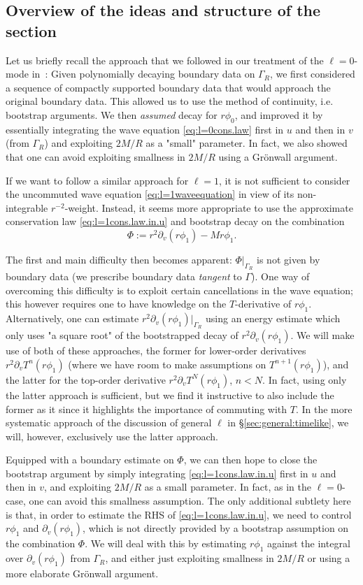 \documentclass[11pt,english]{article}
\numberwithin{equation}{section}
\theoremstyle{remark}
\theoremstyle{plain}
\theoremstyle{remark}
\newcommand{\pv}{\partial_v}
\renewcommand{\(}{\left(}
\renewcommand{\)}{\right)}
\newcommand{\pho}{(r\phi_1)}
\begin{document}
\subsection{Overview of the ideas and structure of the section}
Let us briefly recall the approach that we followed in our treatment of the $\ell=0$-mode in~\cite{I}:  
Given polynomially decaying boundary data on $\Gamma_R$, we first considered a sequence of compactly supported boundary data that would approach the original boundary data. 
This allowed us to use the method of continuity, i.e. bootstrap arguments. 
We then \textit{assumed} decay for $r\phi_0$, and improved it by essentially  integrating the wave equation \eqref{eq:l=0cons.law} first in $u$ and then in $v$ (from $\Gamma_R$) and exploiting $2M/R$ as a "small" parameter. 
In fact, we also showed that one can avoid exploiting smallness in $2M/R$ using a Gr\"onwall argument.


If we want to follow a similar approach for $\ell=1$, it is not sufficient to consider the uncommuted wave equation \eqref{eq:l=1waveequation} in view of its non-integrable $r^{-2}$-weight. 
Instead, it seems more appropriate to use the approximate conservation law \eqref{eq:l=1cons.law.in.u} and bootstrap decay on the combination 
$$\Phi:=r^2\pv(r\phi_1)-Mr\phi_1.$$ 

The first and main difficulty then becomes apparent: $\Phi|_{\Gamma_R}$ is not given by boundary data (we prescribe boundary data \textit{tangent} to $\Gamma$).
 One way of overcoming this difficulty  is to exploit certain cancellations in the wave equation; this however requires one to have knowledge on the $T$-derivative of $r\phi_1$.
  Alternatively, one can  estimate $r^2\pv\pho|_{\Gamma_R}$ using an energy estimate which only uses "a square root" of the bootstrapped decay of $r^2\pv\pho$. 
  We will make use of both of these approaches, the former for lower-order derivatives $r^2\pv T^n\pho$ (where we have room to make assumptions on $T^{n+1}\pho$), and the latter for the top-order derivative $r^2\pv T^N\pho$, $n<N$. 
  In fact,  using only the latter approach is sufficient, but we find it instructive to also include the former as it since it highlights the importance of commuting with $T$.   
   In the more systematic approach of the discussion of general $\ell$ in \S\ref{sec:general:timelike}, we will, however, exclusively use the latter approach.
  
  Equipped with a boundary estimate on $\Phi$, we can then hope to close the bootstrap argument by simply integrating \eqref{eq:l=1cons.law.in.u} first in $u$ and then in $v$, and exploiting $2M/R$ as a small parameter.
   In fact, as in the $\ell=0$-case, one can avoid this smallness assumption. 
   The only additional subtlety here is that, in order to estimate the RHS of \eqref{eq:l=1cons.law.in.u}, we need to control $r\phi_1$ and $\pv(r\phi_1)$, which is not directly provided by a bootstrap assumption on the combination $\Phi$. We will deal with this by estimating $r\phi_1$ against the integral over $\pv(r\phi_1)$ from $\Gamma_R$, and either just exploiting smallness in $2M/R$ or using a more elaborate Gr\"onwall argument.
\end{document}
